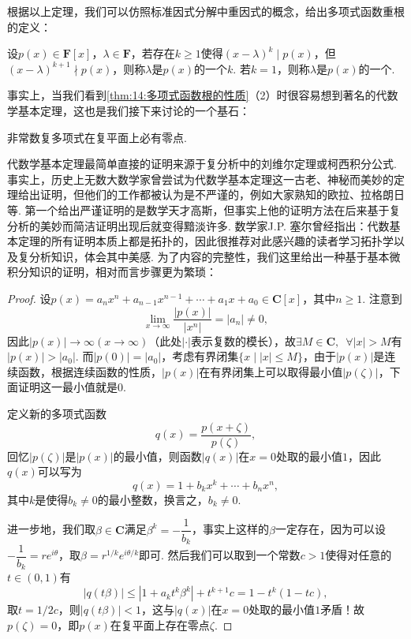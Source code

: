 根据以上定理，我们可以仿照标准因式分解中重因式的概念，给出多项式函数重根的定义：
\begin{definition}
    设$p(x)\in\mathbf{F}[x]$，$\lambda\in\mathbf{F}$，若存在$k\geqslant 1$使得$(x-\lambda)^k\mid p(x)$，但$(x-\lambda)^{k+1}\nmid p(x)$，则称$\lambda$是$p(x)$的一个$k$. 若$k=1$，则称$\lambda$是$p(x)$的一个.
\end{definition}

事实上，当我们看到\autoref{thm:14:多项式函数根的性质}（2）时很容易想到著名的代数学基本定理，这也是我们接下来讨论的一个基石：
\begin{theorem}[代数学基本定理] \label{thm:14:代数学基本定理} 
    非常数复多项式在复平面上必有零点.
\end{theorem}

代数学基本定理最简单直接的证明来源于复分析中的刘维尔定理或柯西积分公式. 事实上，历史上无数大数学家曾尝试为代数学基本定理这一古老、神秘而美妙的定理给出证明，但他们的工作都被认为是不严谨的，例如大家熟知的欧拉、拉格朗日等. 第一个给出严谨证明的是数学天才高斯，但事实上他的证明方法在后来基于复分析的美妙而简洁证明出现后就变得黯淡许多. 数学家J.P. 塞尔曾经指出：代数基本定理的所有证明本质上都是拓扑的，因此很推荐对此感兴趣的读者学习拓扑学以及复分析知识，体会其中美感. 为了内容的完整性，我们这里给出一种基于基本微积分知识的证明，相对而言步骤更为繁琐：
\begin{proof}
    设$p(x)=a_nx^n+a_{n-1}x^{n-1}+\cdots+a_1x+a_0\in\mathbf{C}[x]$，其中$n\geqslant 1$. 注意到
    \[\lim_{x\to\infty}\dfrac{|p(x)|}{|x^n|}=|a_n|\neq 0,\]
    因此$|p(x)|\to\infty(x\to\infty)$（此处$|\cdot|$表示复数的模长），故$\exists M\in\mathbf{C},\enspace\forall |x|>M$有$|p(x)|>|a_0|$. 而$|p(0)|=|a_0|$，考虑有界闭集$\{x\mid |x|\leqslant M\}$，由于$|p(x)|$是连续函数，根据连续函数的性质，$|p(x)|$在有界闭集上可以取得最小值$|p(\zeta)|$，下面证明这一最小值就是$0$.

    定义新的多项式函数
    \[q(x)=\dfrac{p(x+\zeta)}{p(\zeta)},\]
    回忆$|p(\zeta)|$是$|p(x)|$的最小值，则函数$|q(x)|$在$x=0$处取的最小值$1$，因此$q(x)$可以写为
    \[q(x)=1+b_kx^k+\cdots+b_nx^n,\]
    其中$k$是使得$b_k\neq 0$的最小整数，换言之，$b_k\neq 0$.

    进一步地，我们取$\beta\in\mathbf{C}$满足$\beta^k=-\dfrac{1}{b_k}$，事实上这样的$\beta$一定存在，因为可以设$-\dfrac{1}{b_k}=re^{i\theta}$，取$\beta=r^{1/k}e^{i\theta/k}$即可. 然后我们可以取到一个常数$c>1$使得对任意的$t\in(0,1)$有
    \[|q(t\beta)|\leqslant |1+a_kt^k\beta^k|+t^{k+1}c=1-t^k(1-tc),\]
    取$t=1/2c$，则$|q(t\beta)|<1$，这与$|q(x)|$在$x=0$处取的最小值$1$矛盾！故$p(\zeta)=0$，即$p(x)$在复平面上存在零点$\zeta$.
\end{proof}

